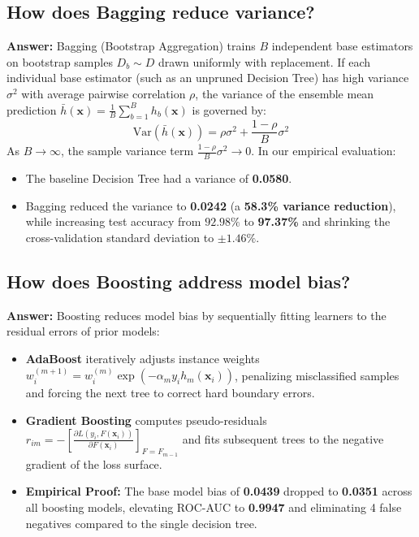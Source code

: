 \documentclass[12pt,a4paper]{article}
\begin{document}
\subsection{How does Bagging reduce variance?}
\textbf{Answer:}
Bagging (Bootstrap Aggregation) trains $B$ independent base estimators on bootstrap samples $D_b \sim D$ drawn uniformly with replacement. If each individual base estimator (such as an unpruned Decision Tree) has high variance $\sigma^2$ with average pairwise correlation $\rho$, the variance of the ensemble mean prediction $\bar{h}(\mathbf{x}) = \frac{1}{B}\sum_{b=1}^B h_b(\mathbf{x})$ is governed by:
\begin{equation}
\text{Var}(\bar{h}(\mathbf{x})) = \rho \sigma^2 + \frac{1-\rho}{B}\sigma^2
\end{equation}
As $B \to \infty$, the sample variance term $\frac{1-\rho}{B}\sigma^2 \to 0$. In our empirical evaluation:
\begin{itemize}
\item The baseline Decision Tree had a variance of \textbf{0.0580}.
\item Bagging reduced the variance to \textbf{0.0242} (a \textbf{58.3\% variance reduction}), while increasing test accuracy from $92.98\%$ to \textbf{97.37\%} and shrinking the cross-validation standard deviation to $\pm 1.46\%$.
\end{itemize}

\subsection{How does Boosting address model bias?}
\textbf{Answer:}
Boosting reduces model bias by sequentially fitting learners to the residual errors of prior models:
\begin{itemize}
\item \textbf{AdaBoost} iteratively adjusts instance weights $w_i^{(m+1)} = w_i^{(m)} \exp(-\alpha_m y_i h_m(\mathbf{x}_i))$, penalizing misclassified samples and forcing the next tree to correct hard boundary errors.
\item \textbf{Gradient Boosting} computes pseudo-residuals $r_{im} = -\left[\frac{\partial L(y_i, F(\mathbf{x}_i))}{\partial F(\mathbf{x}_i)}\right]_{F=F_{m-1}}$ and fits subsequent trees to the negative gradient of the loss surface.
\item \textbf{Empirical Proof:} The base model bias of \textbf{0.0439} dropped to \textbf{0.0351} across all boosting models, elevating ROC-AUC to \textbf{0.9947} and eliminating 4 false negatives compared to the single decision tree.
\end{itemize}
\end{document}
